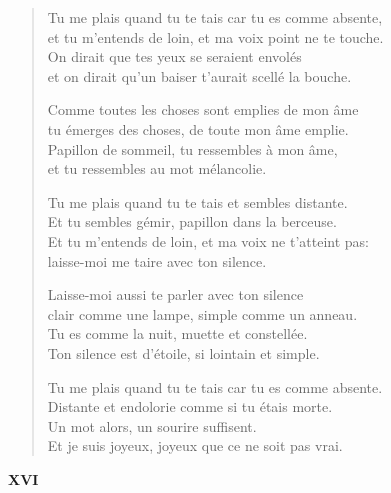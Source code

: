 \documentclass[11pt,a4paper]{book}
\begin{document}
\begin{verse}
  Tu me plais quand tu te tais car tu es comme absente, \\
  et tu m'entends de loin, et ma voix point ne te touche. \\
  On dirait que tes yeux se seraient envolés \\
  et on dirait qu'un baiser t'aurait scellé la bouche.

  Comme toutes les choses sont emplies de mon âme \\
  tu émerges des choses, de toute mon âme emplie. \\
  Papillon de sommeil, tu ressembles à mon âme, \\
  et tu ressembles au mot mélancolie.

  Tu me plais quand tu te tais et sembles distante. \\
  Et tu sembles gémir, papillon dans la berceuse. \\
  Et tu m'entends de loin, et ma voix ne t'atteint pas: \\
  laisse-moi me taire avec ton silence.

  Laisse-moi aussi te parler avec ton silence \\
  clair comme une lampe, simple comme un anneau. \\
  Tu es comme la nuit, muette et constellée. \\
  Ton silence est d'étoile, si lointain et simple.

  Tu me plais quand tu te tais car tu es comme absente. \\
  Distante et endolorie comme si tu étais morte. \\
  Un mot alors, un sourire suffisent. \\
  Et je suis joyeux, joyeux que ce ne soit pas vrai.
\end{verse}

\newpage


\begin{center} \textbf{XVI} \end{center}

\smallskip
\hspace*{60mm}{\scriptsize Paraphrase à R.~Tagore.}

\bigskip
\end{document}
